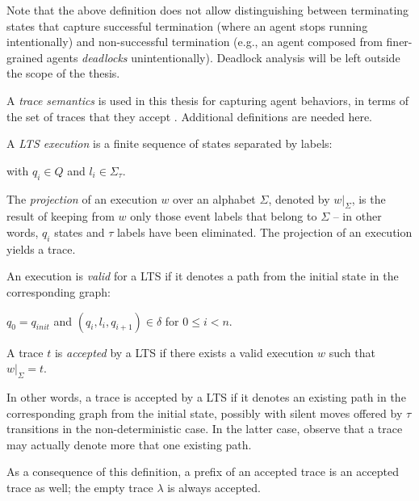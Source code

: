Note that the above definition does not allow distinguishing between terminating states that capture successful termination (where an agent stops running intentionally) and non-successful termination (e.g., an agent composed from finer-grained agents \emph{deadlocks} unintentionally). Deadlock analysis will be left outside the scope of the thesis.

A \emph{trace semantics} is used in this thesis for capturing agent behaviors, in terms of the set of traces that they accept \cite{Hoare:1985}. Additional definitions are needed here. 

\begin{definition}
A \emph{LTS execution} is a finite sequence of states separated by labels:
\begin{center}
\end{center}
\noindent with $q_i \in Q$ and $l_i \in \Sigma_{\tau}$. 
\end{definition}

The \emph{projection} of an execution $w$ over an alphabet $\Sigma$, denoted by $w|_{\Sigma}$, is the result of keeping from $w$ only those event labels that belong to $\Sigma$ -- in other words, $q_i$ states and $\tau$ labels have been eliminated. The projection of an execution yields a trace. 

\begin{definition}
An execution is \emph{valid} for a LTS if it denotes a path from the initial state in the corresponding graph:
\begin{center}
$q_0 = q_{init}$ and $(q_i,l_i,q_{i+1}) \in \delta$ for $0 \leq i < n$. 
\end{center}
\end{definition}

\begin{definition}
A trace $t$ is \emph{accepted} by a LTS if there exists a valid execution $w$ such that $w|_{\Sigma} = t$. 
\end{definition}

In other words, a trace is accepted by a LTS if it denotes an existing path in the corresponding graph from the initial state, possibly with silent moves offered by $\tau$ transitions in the non-deterministic case. In the latter case, observe that a trace may actually denote more that one existing path. 

As a consequence of this definition, a prefix of an accepted trace is an accepted trace as well; the empty trace $\lambda$ is always accepted. 

